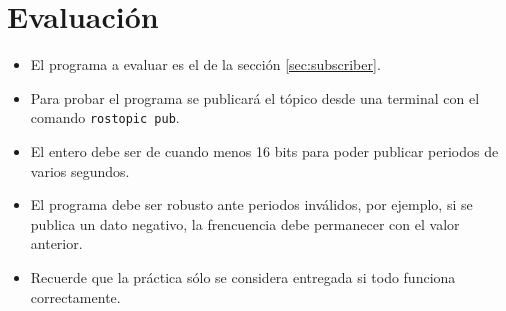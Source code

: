 \documentclass[a4paper,12pt]{article}
\begin{document}
\section{Evaluación}
\begin{itemize}
\item El programa a evaluar es el de la sección \ref{sec:subscriber}.
\item Para probar el programa se publicará el tópico desde una terminal con el comando \texttt{rostopic pub}.
\item El entero debe ser de cuando menos 16 bits para poder publicar periodos de varios segundos.
\item El programa debe ser robusto ante periodos inválidos, por ejemplo, si se publica un dato negativo, la frencuencia debe permanecer con el valor anterior. 
\item Recuerde que la práctica sólo se considera entregada si todo funciona correctamente. 
\end{itemize}
\end{document}
